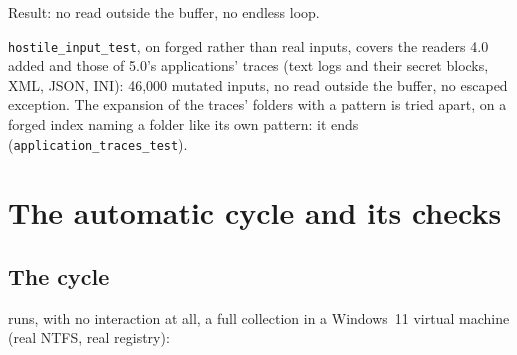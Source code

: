 \documentclass[11pt,a4paper,oneside]{report}
\begin{document}
Result: no read outside the buffer, no endless loop.

\texttt{hostile\_input\_test}, on forged rather than real inputs, covers the readers
4.0 added and those of 5.0's applications' traces (text logs and their secret
blocks, XML, JSON, INI): 46,000 mutated inputs, no read outside the buffer, no
escaped exception. The expansion of the traces' folders with a pattern is tried
apart, on a forged index naming a folder like its own pattern: it ends
(\texttt{application\_traces\_test}).

\chapter{The automatic cycle and its checks}\label{ch:cycle}

\section{The cycle}

 runs, with no interaction at all, a full
collection in a Windows~11 virtual machine (real NTFS, real registry):
\end{document}
